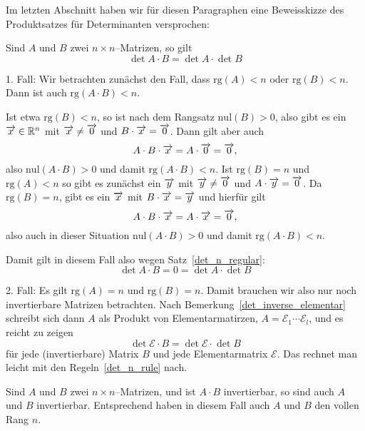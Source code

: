 \bigbreak

Im letzten Abschnitt haben wir für diesen Paragraphen eine Beweisskizze des 
Produktsatzes für Determinanten versprochen:

\begin{satz}[Produktsatz]\label{det_n_produkt_revisit}  
Sind $A$ und  $B$ zwei $n \times n$--Matrizen, so gilt
  	$$ \det{ A \cdot B } = \det{A} \cdot \det{B} $$
\end{satz}


1. Fall: Wir betrachten zunächst den Fall, dass $\mathrm{rg}(A) < n$ oder $\mathrm{rg}(B) < n$. Dann ist auch
$\mathrm{rg}(A \cdot B) < n$.

Ist etwa $\mathrm{rg}(B) < n$, so ist nach dem Rangsatz $\textrm{nul}(B) > 0$, also 
gibt es ein $\overrightarrow{x} \in \mathbb R^n$ mit $\overrightarrow{x} \neq
\overrightarrow{0}$ und $B \cdot \overrightarrow{x} = \overrightarrow{0}$. Dann gilt 
aber auch 
  	$$A \cdot B \cdot \overrightarrow{x} = A \cdot \overrightarrow{0} = 
   	\overrightarrow{0}, $$ 
also $\textrm{nul}(A \cdot B) > 0$ und damit 
$\mathrm{rg}(A \cdot B) < n$. Ist $\mathrm{rg}(B) = n$ und 
$\mathrm{rg}(A) < n$ so gibt es zunächst ein $\overrightarrow{y}$ mit 
$\overrightarrow{y} \neq \overrightarrow{0}$ und $A \cdot \overrightarrow{y} = 
\overrightarrow{0}$. Da $\mathrm{rg}(B) = n$, gibt es ein $\overrightarrow{x}$ mit
$B \cdot \overrightarrow{x} = \overrightarrow{y}$ und hierfür gilt
  	$$ A \cdot B \cdot \overrightarrow{x} = A \cdot \overrightarrow{x} = 
   	\overrightarrow{0}, $$
also auch in dieser Situation $\textrm{nul}(A \cdot B) > 0$ und damit 
$\mathrm{rg}(A \cdot B) < n$.

Damit gilt in diesem Fall also wegen Satz~\ref{det_n_regular}:
  	$$ \det{A \cdot B} = 0 = \det{A} \cdot \det{B} $$

\medbreak

2. Fall: Es gilt $\mathrm{rg}(A) = n$ und $\mathrm{rg}(B) = n$. Damit brauchen wir 
also nur noch invertierbare Matrizen betrachten. Nach 
Bemerkung~\ref{det_inverse_elementar} schreibt sich dann $A$ als Produkt von 
Elementarmatirzen, $ A = \mathcal{E}_1 \cdots \mathcal{E}_l $, und es reicht zu 
zeigen 
  	$$\det{\mathcal{E} \cdot B}  = \det{\mathcal{E}} \cdot \det{B} $$
für jede (invertierbare) Matrix $B$ und jede Elementarmatrix $\mathcal{E}$. 
Das rechnet man leicht mit den Regeln~\ref{det_n_rule} nach.

\bigbreak

\begin{korollar} Sind $A$ und  $B$ zwei $n \times n$--Matrizen, und ist $A \cdot B$ 
invertierbar, so sind auch $A$ und $B$ invertierbar. Entsprechend haben in diesem 
Fall auch $A$ und $B$ den vollen Rang $n$.
\end{korollar}

